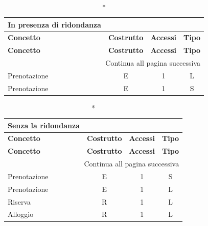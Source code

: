 \small
\setlength\extrarowheight{2pt}
\begin{longtable}{|lccc|}
      \caption*{In presenza di ridondanza}                                             \\

      \hline \textbf{Concetto} & \textbf{Costrutto} & \textbf{Accessi} & \textbf{Tipo} \\\hline
      \endfirsthead

      \hline \textbf{Concetto} & \textbf{Costrutto} & \textbf{Accessi} & \textbf{Tipo} \\\hline
      \endhead

      \hline \multicolumn{4}{|r|}{{Continua all pagina successiva}}                    \\\hline
      \endfoot

      \hline
      \endlastfoot
      Prenotazione             & E                  & 1                & L             \\%
      Prenotazione             & E                  & 1                & S             \\%
\end{longtable}
\normalsize

\small
\setlength\extrarowheight{2pt}
\begin{longtable}{|lccc|}
      \caption*{Senza la ridondanza}   \\

      \hline \textbf{Concetto} & \textbf{Costrutto} & \textbf{Accessi} & \textbf{Tipo} \\\hline
      \endfirsthead

      \hline \textbf{Concetto} & \textbf{Costrutto} & \textbf{Accessi} & \textbf{Tipo} \\\hline
      \endhead

      \hline \multicolumn{4}{|r|}{{Continua all pagina successiva}}                    \\\hline
      \endfoot

      \hline
      \endlastfoot
      Prenotazione             & E                  & 1                & S             \\%
      Prenotazione             & E                  & 1                & L             \\%
      Riserva                  & R                  & 1                & L             \\%
      Alloggio                 & R                  & 1                & L             \\%
\end{longtable}
\normalsize


